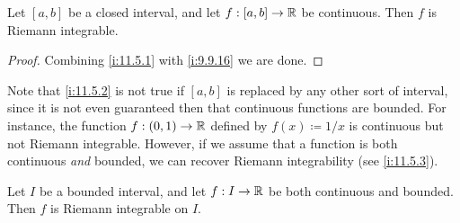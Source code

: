 \begin{cor}\label{i:11.5.2}
  Let \([a, b]\) be a closed interval, and let \(f : [a, b] \to \mathbb{R}\) be continuous.
  Then \(f\) is Riemann integrable.
\end{cor}

\begin{proof}
  Combining \cref{i:11.5.1} with \cref{i:9.9.16} we are done.
\end{proof}

\begin{note}
  Note that \cref{i:11.5.2} is not true if \([a, b]\) is replaced by any other sort of interval, since it is not even guaranteed then that continuous functions are bounded.
  For instance, the function \(f : (0, 1) \to \mathbb{R}\) defined by \(f(x) \coloneqq 1 / x\) is continuous but not Riemann integrable.
  However, if we assume that a function is both continuous \emph{and} bounded, we can recover Riemann integrability (see \cref{i:11.5.3}).
\end{note}

\begin{prop}\label{i:11.5.3}
  Let \(I\) be a bounded interval, and let \(f : I \to \mathbb{R}\) be both continuous and bounded.
  Then \(f\) is Riemann integrable on \(I\).
\end{prop}

